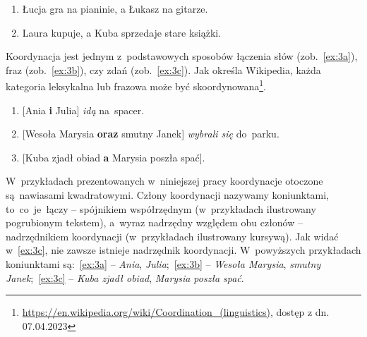 \documentclass[licencjacka]{pracamgr_Kogni}
\begin{document}
    \begin{exe}
        \ex
        \begin{enumerate}[label=\alph{enumi}., ref=(2\alph{enumi})]
            \item {Łucja gra na pianinie, a Łukasz na gitarze.
            \label {ex:2a}}
            \item {Laura kupuje, a Kuba sprzedaje stare książki.
            \label {ex:2b}}
        \end{enumerate}
        \label{ex:2}
    \end{exe}

    Koordynacja jest jednym z~podstawowych sposobów łączenia słów (zob.~\ref{ex:3a}), fraz (zob.~\ref{ex:3b}), czy zdań (zob.~\ref{ex:3c}). Jak określa Wikipedia, każda kategoria leksykalna lub frazowa może być skoordynowana\footnote{\url{https://en.wikipedia.org/wiki/Coordination_(linguistics)}, dostęp z dn. 07.04.2023}.
    \begin{exe}
        \ex
        \begin{enumerate}[label=\alph{enumi}., ref=(3\alph{enumi})]
            \item {[Ania \textbf{i} Julia] \textit{idą} na~spacer.}
            \label {ex:3a}
            \item {[Wesoła Marysia \textbf{oraz} smutny Janek] \textit{wybrali się} do~parku.}
            \label {ex:3b}
            \item {[Kuba zjadł obiad \textbf{a} Marysia poszła spać].}
            \label {ex:3c}
        \end{enumerate}
        \label{ex:3}
    \end{exe}
    W~przykładach prezentowanych w~niniejszej pracy koordynacje otoczone są~nawiasami kwadratowymi.
    Człony koordynacji nazywamy koniunktami, to~co~je~łączy -- spójnikiem współrzędnym (w~przykładach ilustrowany pogrubionym tekstem), a~wyraz nadrzędny względem obu członów -- nadrzędnikiem koordynacji (w~przykładach ilustrowany kursywą).
    Jak widać w~\ref{ex:3c}, nie zawsze istnieje nadrzędnik koordynacji.
    W~powyższych przykładach koniunktami są:~\ref{ex:3a} -- \textit{Ania}, \textit{Julia};~\ref{ex:3b} -- \textit{Wesoła Marysia}, \textit{smutny Janek};~\ref{ex:3c} -- \textit{Kuba zjadł obiad}, \textit{Marysia poszła spać}.
\end{document}
